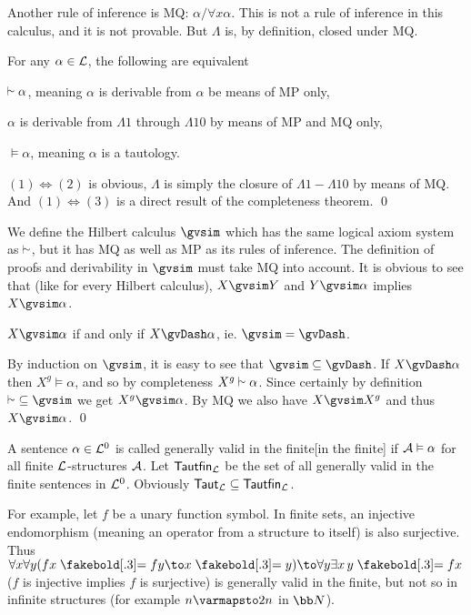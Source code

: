 Another rule of inference is MQ: $\alpha{/}\forall x\alpha$.
This is not a rule of inference in this calculus, and it is not provable.
But $\Lambda$ is, by definition, closed under MQ.

\bcoro

    For any $\alpha\in{\cal L}$, the following are equivalent
    \benum
        \item $\vsim\alpha$, meaning $\alpha$ is derivable from $\alpha$ be means of MP only,
        \item $\alpha$ is derivable from $\Lambda1$ through $\Lambda10$ by means of MP and MQ only,
        \item $\vDash\alpha$, meaning $\alpha$ is a tautology.
    \eenum

\ecoro

$(1)\iff(2)$ is obvious, $\Lambda$ is simply the closure of $\Lambda1-\Lambda10$ by means of MQ.
And $(1)\iff(3)$ is a direct result of the completeness theorem.
\qed

We define the Hilbert calculus $\gvsim$ which has the same logical axiom system as $\vsim$, but it has MQ as well as MP as its rules of inference.
The definition of proofs and derivability in $\gvsim$ must take MQ into account.
It is obvious to see that (like for every Hilbert calculus), $X\gvsim Y$ and $Y\gvsim\alpha$ implies $X\gvsim\alpha$.

\bthrm[title=The Completeness Theorem for $\gvsim$, name=gvsimcompletenesstheorem]

    $X\gvsim\alpha$ if and only if $X\gvDash\alpha$, ie. ${\gvsim}={\gvDash}$.

\ethrm

By induction on $\gvsim$, it is easy to see that ${\gvsim}\subseteq{\gvDash}$.
If $X\gvDash\alpha$ then $X^g\vDash\alpha$, and so by completeness $X^g\vsim\alpha$.
Since certainly by definition ${\vsim}\subseteq{\gvsim}$ we get $X^g\gvsim\alpha$.
By MQ we also have $X\gvsim X^g$ and thus $X\gvsim\alpha$.
\qed

\bdefn

    A sentence $\alpha\in{\cal L}^0$ is called {\emphcolor generally valid in the finite}[in the finite] if ${\cal A}\vDash\alpha$ for all finite ${\cal L}$-structures ${\cal A}$.
    Let ${\sf Tautfin}_{\cal L}$ be the set of all generally valid in the finite sentences in ${\cal L}^0$.
    Obviously ${\sf Taut}_{\cal L}\subseteq{\sf Tautfin}_{\cal L}$.

\edefn

For example, let $f$ be a unary function symbol.
In finite sets, an injective endomorphism (meaning an operator from a structure to itself) is also surjective.
Thus $\forall x\forall y(fx\eq fy\to x\eq y)\to\forall y\exists x\,y\eq fx$ ($f$ is injective implies $f$ is surjective) is generally valid in the finite, but not so in infinite structures (for example
$n\varmapsto2n$ in ${\bb N}$).

